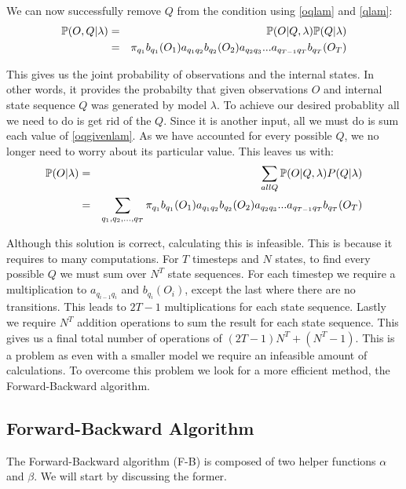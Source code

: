 We can now successfully remove $Q$ from the condition using \ref{oqlam} and \ref{qlam}:
\begin{eqnarray}
    \label{oqgivenlam}
    \mathbb{P} (O,Q | \lambda) & = & \mathbb{P}(O | Q, \lambda) \mathbb{P}(Q | \lambda) \\
                          & = & \pi_{q_1} b_{q_1}(O_1) a_{q_1q_2} b_{q_2}(O_2) a_{q_2q_3} ... a_{q_{T-1}q_T} b_{q_T}(O_T)
\end{eqnarray}

This gives us the joint probability of observations and the internal states. In other words, it provides the probabilty that given observations $O$ and internal state sequence $Q$ was generated by model $\lambda$. To achieve our desired probablity all we need to do is get rid of the $Q$. Since it is another input, all we must do is sum each value of \ref{oqgivenlam}. As we have accounted for every possible $Q$, we no longer need to worry about its particular value. This leaves us with:
\begin{eqnarray}
    \mathbb{P} (O | \lambda) & = & \sum_{all Q} \mathbb{P}(O| Q,\lambda)P(Q|\lambda) \\
                        & = & \sum_{q_1,q_2,...,q_T} \pi_{q_1} b_{q_1}(O_1) a_{q_1q_2} b_{q_2}(O_2) a_{q_2q_3} ... a_{q_{T-1}q_T} b_{q_T}(O_T)
\end{eqnarray} 

Although this solution is correct, calculating this is infeasible. This is because it requires to many computations. For $T$ timesteps and $N$ states, to find every possible $Q$ we must sum over $N^T$ state sequences. For each timestep we require a multiplication to $a_{q_{i-1}q_{i}}$ and $b_{q_i}(O_i)$, except the last where there are no transitions. This leads to $2T-1$ multiplications for each state sequence. Lastly we require $N^T$ addition operations to sum the result for each state sequence. This gives us a final total number of operations of $(2T-1)N^T + (N^T-1)$. This is a problem as even with a smaller model we require an infeasible amount of calculations. To overcome this problem we look for a more efficient method, the Forward-Backward algorithm.



\subsection{Forward-Backward Algorithm}
The Forward-Backward algorithm (F-B) is composed of two helper functions $\alpha$ and $\beta$. We will start by discussing the former.

